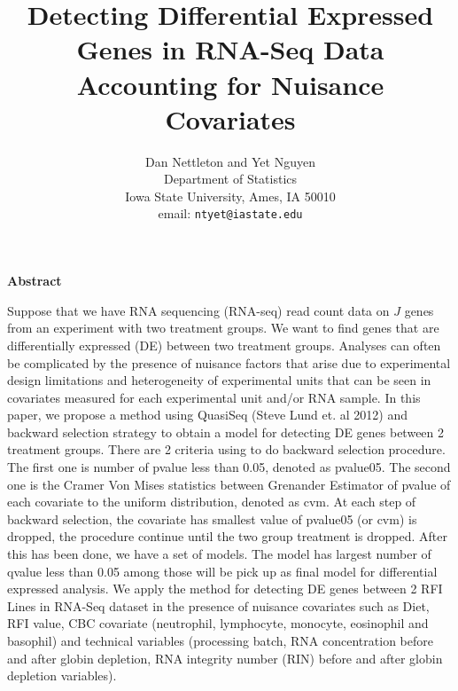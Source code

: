 \documentclass[11pt]{article}
\begin{document}
\title{Detecting Differential Expressed Genes in RNA-Seq Data \\ 
Accounting for Nuisance Covariates}
\author{Dan Nettleton  and Yet Nguyen\\
Department of Statistics \\ 
Iowa State University, Ames, IA 50010\\ 
email: \texttt{ntyet@iastate.edu} }

\maketitle



\newpage
\begin{center}
\textbf{Abstract}
\end{center}

Suppose that we have RNA sequencing (RNA-seq) read count data
on $J$ genes from an experiment with two treatment groups.
We want to find genes that are differentially expressed (DE) between
two treatment groups.
Analyses can often be complicated by the presence of nuisance factors
that arise due to experimental design limitations and heterogeneity of
experimental units that can be seen in  covariates
measured for each experimental unit and/or RNA sample. In this paper, we propose a method using QuasiSeq (Steve Lund et. al 2012) and backward selection strategy to obtain a  model for detecting DE genes between 2 treatment groups. 
There are 2 criteria using to do backward selection procedure. The first one is number of pvalue less than 0.05, denoted as pvalue05. The second one is the Cramer Von Mises statistics between Grenander Estimator of pvalue of each covariate to the uniform distribution, denoted as cvm. At each step of backward selection, the covariate has smallest value of pvalue05 (or cvm) is dropped, the procedure continue until the two group treatment is dropped. After this has been done, we have a set of models. The model has largest number of qvalue less than 0.05 among those will be pick up as final model for differential expressed analysis. We apply the method for detecting DE genes between 2 RFI Lines in RNA-Seq dataset in the presence of nuisance covariates such as Diet, RFI value, CBC covariate (neutrophil, lymphocyte, monocyte, eosinophil and basophil) and technical variables (processing batch, RNA concentration before and after globin depletion, RNA integrity number (RIN) before and after globin depletion
variables).
\end{document}
